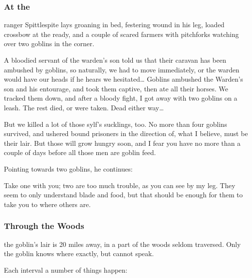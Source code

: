 \documentclass[10pt,twoside]{book}
\begin{document}
\subsubsection{At the }
\gls{ranger} Spittlespite lays groaning in bed, festering wound in his leg, loaded crossbow at the ready, and a couple of scared farmers with pitchforks watching over two goblins in the corner.

\begin{speechtext}
  A bloodied servant of the \gls{warden}'s son told us that their caravan has been ambushed by goblins, so naturally, we had to move immediately, or the warden would have our heads if he hears we hesitated\ldots
  Goblins ambushed the Warden's son and his entourage, and took them captive, then ate all their horses.
  We tracked them down, and after a bloody fight, I got away with two goblins on a leash.
  The rest died, or were taken.
  Dead either way\ldots

  But we killed a lot of those \gls{sylf}'s sucklings, too.
  No more than four goblins survived, and ushered bound prisoners in the direction of, what I believe, must be their lair.
  But those will grow hungry soon, and I fear you have no more than a couple of days before all those men are goblin feed.
\end{speechtext}

Pointing towards two goblins, he continues:

\begin{speechtext}
  Take one with you; two are too much trouble, as you can see by my leg.
  They seem to only understand blade and food, but that should be enough for them to take you to where others are.
\end{speechtext}

\subsubsection{Through the Woods}
the goblin's lair is 20 miles away, in a part of the woods seldom traversed.
Only the goblin knows where exactly, but cannot speak.

%
Each \gls{interval} a number of things happen:
\end{document}
